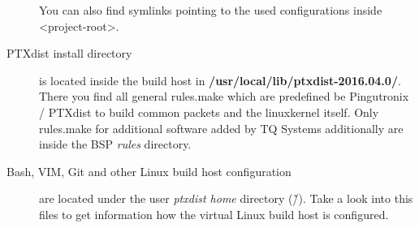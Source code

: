 \begin{description}
        You can also find symlinks pointing to the used configurations inside
        <project-root>.

    \item[PTXdist install directory] is located inside the build host in
        \newline \textbf{/usr/local/lib/ptxdist-2016.04.0/}. There you find all
        general rules.make which are predefined be Pingutronix / PTXdist to
        build common packets and the linuxkernel itself. Only rules.make for
        additional software added by TQ Systems additionally are inside the BSP
        \textit{rules} directory.

    \item[Bash, VIM, Git and other Linux build host configuration] are located
        under the user \textit{ptxdist home} directory (\~/). Take a look into
        this files to get information how the virtual Linux build host is
        configured.

\end{description}

